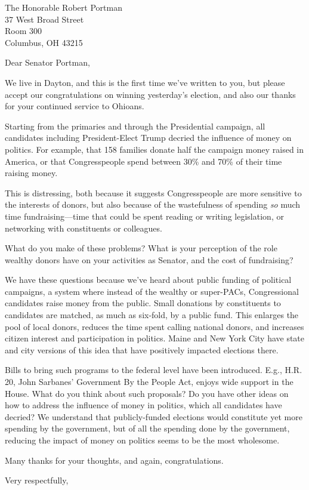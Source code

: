 \documentclass{letter}
\begin{document}
\begin{letter}{
  The Honorable Robert Portman \\
  37 West Broad Street \\
  Room 300 \\
  Columbus, OH 43215}

\opening{Dear Senator Portman,}

We live in Dayton, and this is the first time we've written to you, but please accept our congratulations on winning yesterday's election, and also our thanks for your continued service to Ohioans.

Starting from the primaries and through the Presidential campaign, all candidates including President-Elect Trump decried the influence of money on politics. For example, that 158 families donate half the campaign money raised in America, or that Congresspeople spend between 30\% and 70\% of their time raising money.

This is distressing, both because it suggests Congresspeople are more sensitive to the interests of donors, but also because of the wastefulness of spending {\em so} much time fundraising---time that could be spent reading or writing legislation, or networking with constituents or colleagues.

What do you make of these problems? What is your perception of the role wealthy donors have on your activities as Senator, and the cost of fundraising?

We have these questions because we've heard about public funding of political campaigns, a system where instead of the wealthy or super-PACs, Congressional candidates raise money from the public. Small donations by constituents to candidates are matched, as much as six-fold, by a public fund. This enlarges the pool of local donors, reduces the time spent calling national donors, and increases citizen interest and participation in politics. Maine and New York City have state and city versions of this idea that have positively impacted elections there.

Bills to bring such programs to the federal level have been introduced. E.g., H.R. 20, John Sarbanes' Government By the People Act, enjoys wide support in the House. What do you think about such proposals? Do you have other ideas on how to address the influence of money in politics, which all candidates have decried? We understand that publicly-funded elections would constitute yet more spending by the government, but of all the spending done by the government, reducing the impact of money on politics seems to be the most wholesome.

Many thanks for your thoughts, and again, congratulations.


\closing{Very respectfully,}


\end{letter}
\end{document}
